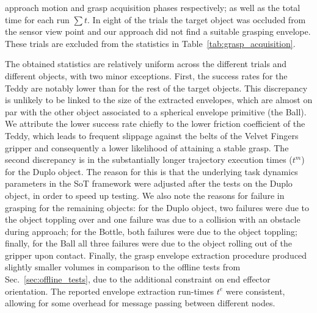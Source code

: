 approach motion and grasp acquisition phases respectively; 
as well as the total time for each run $\sum t$.  
In eight of the trials the target object was occluded from the sensor view point and our approach did not find a suitable grasping envelope. 
These trials are excluded from the statistics in Table~\ref{tab:grasp_acquisition}.
\par
The obtained statistics are relatively uniform across the different trials and different objects, with two minor exceptions.
First, the success rates for the Teddy are notably lower than for the rest of the target objects.
This discrepancy is unlikely to be linked to the size of the extracted envelopes, which are almost on par with the other object associated to a spherical envelope primitive (the Ball).
We attribute the lower success rate chiefly to the lower friction coefficient of the Teddy, which leads to frequent slippage against the belts of the Velvet Fingers gripper and consequently a lower likelihood of attaining a stable grasp. 
The second discrepancy is in the substantially longer trajectory execution times ($t^m$) for the Duplo object. 
The reason for this is that the underlying task dynamics parameters in the SoT framework were adjusted after the tests on the Duplo object, in order to speed up testing.
We also note the reasons for failure in grasping for the remaining objects: for the Duplo object, two failures were due to the object toppling over and one failure was due to a collision with an obstacle during approach; for the Bottle, both failures were due to the object toppling; finally, for the Ball all three failures were due to the object rolling out of the gripper upon contact. 
Finally, the grasp envelope extraction procedure produced slightly smaller volumes in comparison to the offline tests from Sec.~\ref{sec:offline_tests}, due to the additional constraint on end effector orientation. 
The reported envelope extraction run-times $t^e$ were consistent, allowing for some overhead for message passing between different nodes.
%
